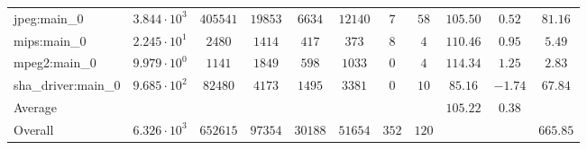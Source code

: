 \begin{tabular}{|l|c|c|c|c|c|c|c|c|c|c|}
jpeg:main\_0            & $ 3.844 \cdot 10^{3}  $ & $ 405541 $ & $ 19853 $ & $ 6634  $ & $ 12140 $ & $ 7   $ & $ 58  $ & $ 105.50      $ & $ 0.52    $ & $ 81.16   $ \\
mips:main\_0            & $ 2.245 \cdot 10^{1}  $ & $ 2480   $ & $ 1414  $ & $ 417   $ & $ 373   $ & $ 8   $ & $ 4   $ & $ 110.46      $ & $ 0.95    $ & $ 5.49    $ \\
mpeg2:main\_0           & $ 9.979 \cdot 10^{0}  $ & $ 1141   $ & $ 1849  $ & $ 598   $ & $ 1033  $ & $ 0   $ & $ 4   $ & $ 114.34      $ & $ 1.25    $ & $ 2.83    $ \\
sha\_driver:main\_0     & $ 9.685 \cdot 10^{2}  $ & $ 82480  $ & $ 4173  $ & $ 1495  $ & $ 3381  $ & $ 0   $ & $ 10  $ & $ 85.16       $ & $ -1.74   $ & $ 67.84   $ \\
\hline
Average                 & $                     $ & $        $ & $       $ & $       $ & $       $ & $     $ & $     $ & $ 105.22      $ & $ 0.38    $ & $         $ \\
\hline
Overall                 & $ 6.326 \cdot 10^{3}  $ & $ 652615 $ & $ 97354 $ & $ 30188 $ & $ 51654 $ & $ 352 $ & $ 120 $ & $             $ & $         $ & $ 665.85  $ \\
\hline
\end{tabular}
